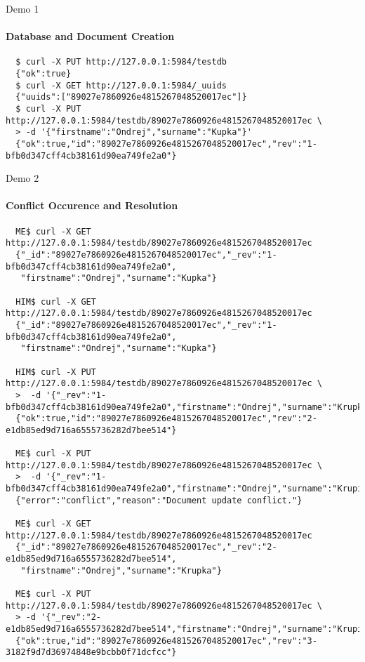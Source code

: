 \documentclass{beamer}
\begin{document}
\begin{frame}[fragile]{Demo 1}
  \framesubtitle{Database and Document Creation}
  \fontsize{6}{8}\selectfont
  \begin{verbatim}
  $ curl -X PUT http://127.0.0.1:5984/testdb
  {"ok":true}
  $ curl -X GET http://127.0.0.1:5984/_uuids
  {"uuids":["89027e7860926e4815267048520017ec"]}
  $ curl -X PUT http://127.0.0.1:5984/testdb/89027e7860926e4815267048520017ec \
  > -d '{"firstname":"Ondrej","surname":"Kupka"}'
  {"ok":true,"id":"89027e7860926e4815267048520017ec","rev":"1-bfb0d347cff4cb38161d90ea749fe2a0"}
  \end{verbatim}
\end{frame}

\begin{frame}[fragile]{Demo 2}
  \framesubtitle{Conflict Occurence and Resolution}
  \fontsize{6}{8}\selectfont
  \begin{verbatim}
  ME$ curl -X GET http://127.0.0.1:5984/testdb/89027e7860926e4815267048520017ec
  {"_id":"89027e7860926e4815267048520017ec","_rev":"1-bfb0d347cff4cb38161d90ea749fe2a0",
   "firstname":"Ondrej","surname":"Kupka"}

  HIM$ curl -X GET http://127.0.0.1:5984/testdb/89027e7860926e4815267048520017ec
  {"_id":"89027e7860926e4815267048520017ec","_rev":"1-bfb0d347cff4cb38161d90ea749fe2a0",
   "firstname":"Ondrej","surname":"Kupka"}

  HIM$ curl -X PUT http://127.0.0.1:5984/testdb/89027e7860926e4815267048520017ec \
  >  -d '{"_rev":"1-bfb0d347cff4cb38161d90ea749fe2a0","firstname":"Ondrej","surname":"Krupka"}'
  {"ok":true,"id":"89027e7860926e4815267048520017ec","rev":"2-e1db85ed9d716a6555736282d7bee514"}

  ME$ curl -X PUT http://127.0.0.1:5984/testdb/89027e7860926e4815267048520017ec \
  >  -d '{"_rev":"1-bfb0d347cff4cb38161d90ea749fe2a0","firstname":"Ondrej","surname":"Krupicka"}'
  {"error":"conflict","reason":"Document update conflict."}

  ME$ curl -X GET http://127.0.0.1:5984/testdb/89027e7860926e4815267048520017ec
  {"_id":"89027e7860926e4815267048520017ec","_rev":"2-e1db85ed9d716a6555736282d7bee514",
   "firstname":"Ondrej","surname":"Krupka"}

  ME$ curl -X PUT http://127.0.0.1:5984/testdb/89027e7860926e4815267048520017ec \
  > -d '{"_rev":"2-e1db85ed9d716a6555736282d7bee514","firstname":"Ondrej","surname":"Krupicka"}'
  {"ok":true,"id":"89027e7860926e4815267048520017ec","rev":"3-3182f9d7d36974848e9bcbb0f71dcfcc"}
  \end{verbatim}
\end{frame}
\end{document}
